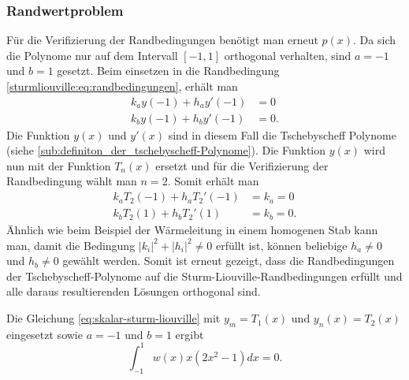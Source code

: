 \subsubsection*{Randwertproblem}
Für die Verifizierung der Randbedingungen benötigt man erneut $p(x)$.
Da sich die Polynome nur auf dem Intervall $[ -1,1 ]$ orthogonal verhalten,
sind $a = -1$ und $b = 1$ gesetzt.
Beim einsetzen in die Randbedingung \eqref{sturmliouville:eq:randbedingungen},
erhält man
\begin{equation}
\begin{aligned}
	k_a y(-1) + h_a y'(-1) &= 0\\
	k_b y(-1) + h_b y'(-1) &= 0.
\end{aligned} 
\end{equation}
Die Funktion $y(x)$ und $y'(x)$ sind in diesem Fall die Tschebyscheff Polynome
(siehe \ref{sub:definiton_der_tschebyscheff-Polynome}).
Die Funktion $y(x)$ wird nun mit der Funktion $T_n(x)$ ersetzt und für die
Verifizierung der Randbedingung wählt man $n=2$.
Somit erhält man
\begin{equation}
	\begin{aligned}
	k_a T_2(-1) + h_a T_{2}'(-1) &= k_a = 0\\
	k_b T_2(1) + h_b T_{2}'(1) &= k_b = 0.
	\end{aligned}
\end{equation}
Ähnlich wie beim Beispiel der Wärmeleitung in einem homogenen Stab kann man,
damit die Bedingung $|k_i|^2 + |h_i|^2\ne 0$ erfüllt ist, können beliebige
$h_a \ne 0$ und $h_b \ne 0$ gewählt werden.
Somit ist erneut gezeigt, dass die Randbedingungen der Tschebyscheff-Polynome
auf die Sturm-Liouville-Randbedingungen erfüllt und alle daraus resultierenden
Lösungen orthogonal sind.

\begin{beispiel}
	Die Gleichung \eqref{eq:skalar-sturm-liouville} mit
	$y_m = T_1(x)$ und $y_n(x) = T_2(x)$ eingesetzt sowie $a=-1$ und $b = 1$
	ergibt
	\[
	\int_{-1}^{1} w(x) x (2x^2-1) dx = 0.
	\]
\end{beispiel}
